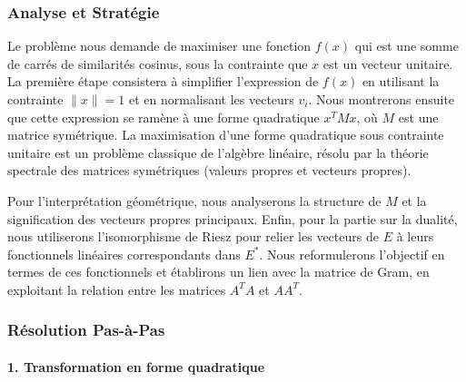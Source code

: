 \documentclass[11pt,a4paper]{report}
\begin{document}
\hypertarget{analyse-et-stratuxe9gie}{%
\subsubsection{Analyse et Stratégie}\label{analyse-et-stratuxe9gie}}

Le problème nous demande de maximiser une fonction \(f(x)\) qui est une
somme de carrés de similarités cosinus, sous la contrainte que \(x\) est
un vecteur unitaire. La première étape consistera à simplifier
l'expression de \(f(x)\) en utilisant la contrainte \(\|x\|=1\) et en
normalisant les vecteurs \(v_i\). Nous montrerons ensuite que cette
expression se ramène à une forme quadratique \(x^T M x\), où \(M\) est
une matrice symétrique. La maximisation d'une forme quadratique sous
contrainte unitaire est un problème classique de l'algèbre linéaire,
résolu par la théorie spectrale des matrices symétriques (valeurs
propres et vecteurs propres).

Pour l'interprétation géométrique, nous analyserons la structure de
\(M\) et la signification des vecteurs propres principaux. Enfin, pour
la partie sur la dualité, nous utiliserons l'isomorphisme de Riesz pour
relier les vecteurs de \(E\) à leurs fonctionnels linéaires
correspondants dans \(E^*\). Nous reformulerons l'objectif en termes de
ces fonctionnels et établirons un lien avec la matrice de Gram, en
exploitant la relation entre les matrices \(A^T A\) et \(A A^T\).

\hypertarget{ruxe9solution-pas-uxe0-pas}{%
\subsubsection{Résolution Pas-à-Pas}\label{ruxe9solution-pas-uxe0-pas}}

\hypertarget{transformation-en-forme-quadratique}{%
\paragraph{1. Transformation en forme
quadratique}\label{transformation-en-forme-quadratique}}
\end{document}
